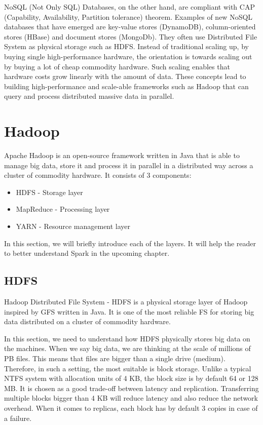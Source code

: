 NoSQL (Not Only SQL) Databases, on the other hand, are compliant with CAP (Capability, Availability, Partition tolerance) theorem.  Examples of new NoSQL databases that have emerged are key-value stores (DynamoDB), column-oriented stores (HBase) and document stores (MongoDb). They often use Distributed File System as physical storage such as HDFS. Instead of traditional scaling up, by buying single high-performance hardware, the orientation is towards scaling out by buying a lot of cheap commodity hardware. Such scaling enables that hardware costs grow linearly with the amount of data.  These concepts lead to building high-performance and scale-able frameworks such as Hadoop that can query and process distributed massive data in parallel. 

\section{Hadoop}
Apache Hadoop \cite{Hadoop} is an open-source framework written in Java that is able to manage big data, store it and process it in parallel in a distributed way across a cluster of commodity hardware. It consists of 3 components:
\begin{itemize}
	\item HDFS - Storage layer
	\item MapReduce - Processing layer
	\item YARN - Resource management layer
\end{itemize}

In this section, we will briefly introduce each of the layers. It will help the reader to better understand Spark in the upcoming chapter.

\subsection{HDFS}
Hadoop Distributed File System - HDFS \cite{HDFS} is a physical storage layer of Hadoop inspired by GFS \cite{GFS} written in Java. It is one of the most reliable FS for storing big data distributed on a cluster of commodity hardware. 

In this section, we need to understand how HDFS physically stores big data on the machines. When we say big data, we are thinking at the scale of millions of PB files. This means that files are bigger than a single drive (medium). Therefore, in such a setting, the most suitable is block storage. Unlike a typical NTFS system with allocation units of 4 KB, the block size is by default 64 or 128 MB. It is chosen as a good trade-off between latency and replication. Transferring multiple blocks bigger than 4 KB will reduce latency and also reduce the network overhead. When it comes to replicas, each block has by default 3 copies in case of a failure.  


